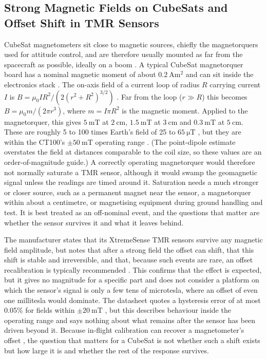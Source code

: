 \documentclass[12pt,a4paper]{article}
\begin{document}
\subsection{Strong Magnetic Fields on CubeSats and Offset Shift in TMR Sensors}
\label{sec:strong-field-lit}

CubeSat magnetometers sit close to magnetic sources, chiefly the magnetorquers used for attitude control, and are therefore usually mounted as far from the spacecraft as possible, ideally on a boom \cite{nss_magnetometer}. A typical CubeSat magnetorquer board has a nominal magnetic moment of about $\SI{0.2}{\ampere\metre\squared}$ and can sit inside the electronics stack \cite{isis_imtq}. The on-axis field of a current loop of radius $R$ carrying current $I$ is $B = \mu_0 I R^2 / \left(2(r^2+R^2)^{3/2}\right)$ \cite{openstax_up2}. Far from the loop ($r \gg R$) this becomes $B = \mu_0 m / (2\pi r^3)$, where $m = I\pi R^2$ is the magnetic moment. Applied to the magnetorquer, this gives $\SI{5}{\milli\tesla}$ at $\SI{2}{\centi\metre}$, $\SI{1.5}{\milli\tesla}$ at $\SI{3}{\centi\metre}$ and $\SI{0.3}{\milli\tesla}$ at $\SI{5}{\centi\metre}$. These are roughly 5 to 100 times Earth's field of 25 to $\SI{65}{\micro\tesla}$ \cite{wmm}, but they are within the CT100's $\pm\SI{50}{\milli\tesla}$ operating range \cite{ct100_datasheet}. (The point-dipole estimate overstates the field at distances comparable to the coil size, so these values are an order-of-magnitude guide.) A correctly operating magnetorquer would therefore not normally saturate a TMR sensor, although it would swamp the geomagnetic signal unless the readings are timed around it. Saturation needs a much stronger or closer source, such as a permanent magnet near the sensor, a magnetorquer within about a centimetre, or magnetising equipment during ground handling and test. It is best treated as an off-nominal event, and the questions that matter are whether the sensor survives it and what it leaves behind.

The manufacturer states that its XtremeSense TMR sensors survive any magnetic field amplitude, but notes that after a strong field the offset can shift, that this shift is stable and irreversible, and that, because such events are rare, an offset recalibration is typically recommended \cite{allegro_an133}. This confirms that the effect is expected, but it gives no magnitude for a specific part and does not consider a platform on which the sensor's signal is only a few tens of microtesla, where an offset of even one millitesla would dominate. The datasheet quotes a hysteresis error of at most 0.05\% for fields within $\pm\SI{20}{\milli\tesla}$ \cite{ct100_datasheet}, but this describes behaviour inside the operating range and says nothing about what remains after the sensor has been driven beyond it. Because in-flight calibration can recover a magnetometer's offset \cite{archer2015}, the question that matters for a CubeSat is not whether such a shift exists but how large it is and whether the rest of the response survives.
\end{document}
